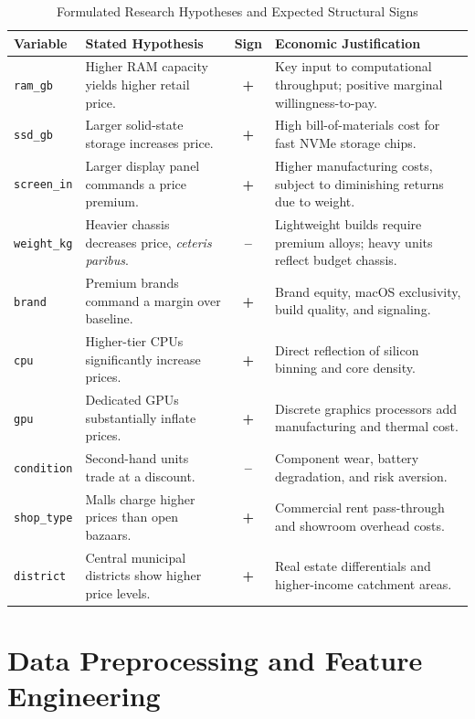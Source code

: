 \documentclass[11pt, a4paper]{article}
\begin{document}
\begin{table}[h!]
\centering
\caption{Formulated Research Hypotheses and Expected Structural Signs}
\vspace{0.2cm}
\small
\begin{tabularx}{\linewidth}{l X c X}
\toprule
\textbf{Variable} & \textbf{Stated Hypothesis} & \textbf{Sign} & \textbf{Economic Justification} \\
\midrule
\texttt{ram\_gb} & Higher RAM capacity yields higher retail price. & \textbf{+} & Key input to computational throughput; positive marginal willingness-to-pay. \\
\texttt{ssd\_gb} & Larger solid-state storage increases price. & \textbf{+} & High bill-of-materials cost for fast NVMe storage chips. \\
\texttt{screen\_in} & Larger display panel commands a price premium. & \textbf{+} & Higher manufacturing costs, subject to diminishing returns due to weight. \\
\texttt{weight\_kg} & Heavier chassis decreases price, \textit{ceteris paribus}. & \textbf{--} & Lightweight builds require premium alloys; heavy units reflect budget chassis. \\
\texttt{brand} & Premium brands command a margin over baseline. & \textbf{+} & Brand equity, macOS exclusivity, build quality, and signaling. \\
\texttt{cpu} & Higher-tier CPUs significantly increase prices. & \textbf{+} & Direct reflection of silicon binning and core density. \\
\texttt{gpu} & Dedicated GPUs substantially inflate prices. & \textbf{+} & Discrete graphics processors add manufacturing and thermal cost. \\
\texttt{condition} & Second-hand units trade at a discount. & \textbf{--} & Component wear, battery degradation, and risk aversion. \\
\texttt{shop\_type} & Malls charge higher prices than open bazaars. & \textbf{+} & Commercial rent pass-through and showroom overhead costs. \\
\texttt{district} & Central municipal districts show higher price levels. & \textbf{+} & Real estate differentials and higher-income catchment areas. \\
\bottomrule
\end{tabularx}
\end{table}

\section{Data Preprocessing and Feature Engineering}
\end{document}
